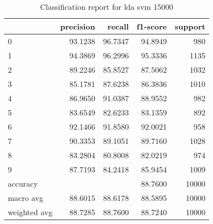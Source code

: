 \begin{table}[htb!]
\centering
\begin{tabular}{lrrrr}
    \toprule
    & precision & recall & f1-score & support \\
\midrule
0 & 93.1238 & 96.7347 & 94.8949 & 980 \\
1 & 94.3869 & 96.2996 & 95.3336 & 1135 \\
2 & 89.2246 & 85.8527 & 87.5062 & 1032 \\
3 & 85.1781 & 87.6238 & 86.3836 & 1010 \\
4 & 86.9650 & 91.0387 & 88.9552 & 982 \\
5 & 83.6549 & 82.6233 & 83.1359 & 892 \\
6 & 92.1466 & 91.8580 & 92.0021 & 958 \\
7 & 90.3353 & 89.1051 & 89.7160 & 1028 \\
8 & 83.2804 & 80.8008 & 82.0219 & 974 \\
9 & 87.7193 & 84.2418 & 85.9454 & 1009 \\
accuracy & & & 88.7600 & 10000 \\
macro avg & 88.6015 & 88.6178 & 88.5895 & 10000 \\
weighted avg & 88.7285 & 88.7600 & 88.7240 & 10000 \\
\bottomrule
\end{tabular}
\caption{Classification report for lda svm 15000}
\label{tab:classification-report-lda_svm_15000}
\end{table}
